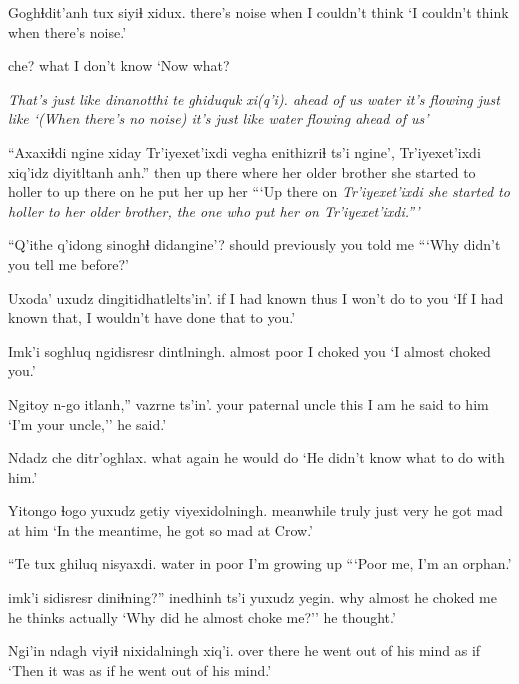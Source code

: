 \documentclass[12pt]{article}
\begin{document}
\gll Goghɬdit'anh tux  {siyiɬ xidux}.
{there's noise} when {I couldn't think} 
\glt  `I couldn't think when there's noise.'
\glend

 che? 
what {I don't know} 
\glt `Now what? 
\glend

\gll \em{That's just like } dinanotthi  te    ghiduquk xi(q'i).
{} {ahead of us} water {it's flowing} {just like}
\glt `(When there's no noise) it's just like water flowing ahead of us'
\glend

\gll ``Axaxiɬdi ngine   xiday Tr'iyexet'ixdi vegha             enithizriɬ      ts'i ngine', Tr'iyexet'ixdi xiq'idz diyitltanh anh.''
then     {up there} where {}           {her older brother}  {she started to holler to} {} {up there} {}             on      {he put her up} her
\glt ```Up there on \em Tr'iyexet'ixdi \em she started to holler to her older brother, the one who put her on \em Tr'iyexet'ixdi.''' 
\glend

\gll ``Q'ithe   q'idong    {sinoghɬ didangine'?}
should previously {you told me}
\glt ```Why didn't you tell me before?'
\glend

\gll Uxoda'         uxudz {dingitidhatlelts'in'.}
{if I had known} thus  {I won't do to you}
\glt `If I had known that, I wouldn't have done that to you.'
\glend

\gll Imk'i  soghluq {ngidisresr dintlningh.}
almost poor    {I choked you}
\glt `I almost choked you.'
\glend

\gll Ngitoy n-go itlanh,'' vazrne ts'in'.
{your paternal uncle} this {I am} {he said to him} 
\glt `I'm your uncle,'' he said.'
\glend

\gll Ndadz che ditr'oghlax.
what  again {he would do}
\glt `He didn't know what to do with him.'
\glend

\gll Yitongo   ɬogo  yuxudz getiy viyexidolningh.
meanwhile truly just   very  {he got mad at him}
\glt `In the meantime, he got so mad at Crow.'
\glend

\gll ``Te    tux ghiluq nisyaxdi.
water in  poor   {I'm growing up}
\glt ```Poor me, I'm an orphan.'
\glend

 imk'i  {sidisresr diniɬning?}'' inedhinh ts'i {yuxudz yegin}.
why           almost {he choked me}         {he thinks} {} actually    
\glt `Why did he almost choke me?'' he thought.'
\glend

\gll Ngi'in     {ndagh viyiɬ nixidalningh}      xiq'i.
{over there} {he went out of his mind} {as if}
\glt `Then it was as if he went out of his mind.'
\glend
\end{document}
